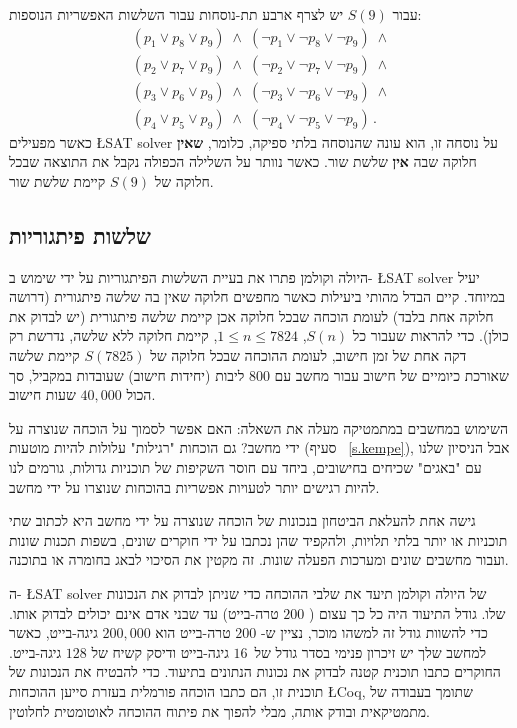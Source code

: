 עבור 
$S(9)$
יש לצרף ארבע תת-נוסחות עבור השלשות האפשריות הנוספות:
\[
\begin{array}{l}
(p_1 \vee p_8 \vee p_9) \;\wedge\; (\neg p_1 \vee \neg p_8 \vee \neg p_9) \;\wedge \\
(p_2 \vee p_7 \vee p_9) \;\wedge\; (\neg p_2 \vee \neg p_7 \vee \neg p_9) \;\wedge \\
(p_3 \vee p_6 \vee p_9) \;\wedge\; (\neg p_3 \vee \neg p_6 \vee \neg p_9) \;\wedge \\
(p_4 \vee p_5 \vee p_9) \;\wedge\; (\neg p_4 \vee \neg p_5 \vee \neg p_9)\,.
\end{array}
\]
כאשר מפעילים 
\L{SAT solver}
על נוסחה זו, הוא עונה שהנוסחה בלתי ספיקה, כלומר, 
\textbf{שאין}
חלוקה שבה 
\textbf{אין }
שלשת שור.
כאשר נוותר על השלילה הכפולה נקבל את התוצאה שבכל חלוקה של
$S(9)$
קיימת שלשת שור.

\subsection{שלשות פיתגוריות }

היולה וקולמן
פתרו את בעיית השלשות הפיתגוריות
על ידי שימוש ב-%
\L{SAT solver}
יעיל במיוחד. קיים הבדל מהותי ביעילות כאשר מחפשים חלוקה שאין בה שלשה פיתגורית
(דרושה חלוקה אחת בלבד) לעומת הוכחה שבכל חלוקה אכן קיימת שלשה פיתגורית
(יש לבדוק את כולן). כדי להראות שעבור כל
$S(n)$, $1\leq n\leq 7824$, 
קיימת חלוקה ללא שלשה, נדרשת רק דקה אחת של זמן חישוב, לעומת ההוכחה שבכל חלוקה של
$S(7825)$
קיימת שלשה שאורכת כיומיים של חישוב עבור מחשב עם
$800$
ליבות (יחידות חישוב) שעובדות במקביל, סך הכול 
$40,000$
שעות חישוב.

השימוש במחשבים במתמטיקה מעלה את השאלה: האם אפשר לסמוך על הוכחה שנוצרה על ידי מחשב? גם הוכחות "רגילות" עלולות להיות מוטעות (סעיף%
~\ref{s.kempe}),
אבל הניסיון שלנו עם "באגים" שכיחים בחישובים, ביחד עם חוסר השקיפות של תוכניות גדולות, גורמים לנו להיות רגישים יותר לטעויות אפשריות בהוכחות שנוצרו על ידי מחשב.

גישה אחת להעלאת הביטחון בנכונות של הוכחה שנוצרה על ידי מחשב היא לכתוב שתי תוכניות או יותר בלתי תלויות, ולהקפיד שהן נכתבו על ידי חוקרים שונים, בשפות תכנות שונות ועבור מחשבים שונים ומערכות הפעלה שונות. זה מקטין את הסיכוי לבאג בחומרה או בתוכנה.

ה-%
\L{SAT solver}
של היולה וקולמן
תיעד את שלבי ההוכחה כדי שניתן לבדוק את הנכונות שלו. גודל התיעוד היה כל כך עצום (%
$200$
טרה-בייט) עד שבני אדם אינם יכולים לבדוק אותו. כדי להשוות גודל זה למשהו מוכר, נציין ש-%
$200$
טרה-בייט הוא 
$200,\!000$
גיגה-בייט, כאשר למחשב שלך יש זיכרון פנימי בסדר גודל של\
$16$
גיגה-בייט ודיסק קשיח של
$128$
גיגה-בייט. החוקרים כתבו תוכנית קטנה לבדוק את נכונות הנתונים בתיעוד. כדי להבטיח את הנכונות של תוכנית זו, הם כתבו הוכחה פורמלית בעזרת סייען ההוכחות
\L{Coq},
שתומך בעבודה של מתמטיקאית ובודק אותה, מבלי להפוך את פיתוח ההוכחה לאוטומטית לחלוטין.

